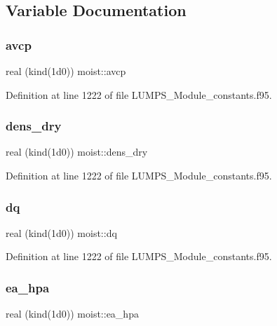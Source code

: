 \subsection{Variable Documentation}
\mbox{\label{namespacemoist_ab97dbf8fcbd5d11d712712430254200c}} 
\subsubsection{\texorpdfstring{avcp}{avcp}}
{\footnotesize\ttfamily real (kind(1d0)) moist\+::avcp}



Definition at line 1222 of file L\+U\+M\+P\+S\+\_\+\+Module\+\_\+constants.\+f95.

\mbox{\label{namespacemoist_a86e17481beeffe41b498ff747fc52360}} 
\subsubsection{\texorpdfstring{dens\+\_\+dry}{dens\_dry}}
{\footnotesize\ttfamily real (kind(1d0)) moist\+::dens\+\_\+dry}



Definition at line 1222 of file L\+U\+M\+P\+S\+\_\+\+Module\+\_\+constants.\+f95.

\mbox{\label{namespacemoist_ac54b9750ff8d2f544e3706dc3c7ea73d}} 
\subsubsection{\texorpdfstring{dq}{dq}}
{\footnotesize\ttfamily real (kind(1d0)) moist\+::dq}



Definition at line 1222 of file L\+U\+M\+P\+S\+\_\+\+Module\+\_\+constants.\+f95.

\mbox{\label{namespacemoist_a19f55d056cfde820ca8beafe774a0688}} 
\subsubsection{\texorpdfstring{ea\+\_\+hpa}{ea\_hpa}}
{\footnotesize\ttfamily real (kind(1d0)) moist\+::ea\+\_\+hpa}



